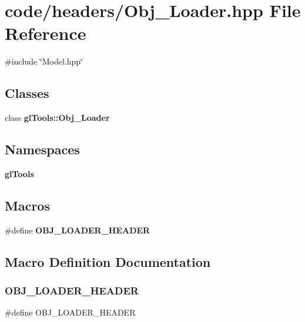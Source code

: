 \section{code/headers/\+Obj\+\_\+\+Loader.hpp File Reference}
\label{_obj___loader_8hpp}
{\ttfamily \#include \char`\"{}Model.\+hpp\char`\"{}}\newline
\subsection*{Classes}
\begin{DoxyCompactItemize}
\item 
class \textbf{ gl\+Tools\+::\+Obj\+\_\+\+Loader}
\end{DoxyCompactItemize}
\subsection*{Namespaces}
\begin{DoxyCompactItemize}
\item 
 \textbf{ gl\+Tools}
\end{DoxyCompactItemize}
\subsection*{Macros}
\begin{DoxyCompactItemize}
\item 
\#define \textbf{ O\+B\+J\+\_\+\+L\+O\+A\+D\+E\+R\+\_\+\+H\+E\+A\+D\+ER}
\end{DoxyCompactItemize}


\subsection{Macro Definition Documentation}
\mbox{\label{_obj___loader_8hpp_a4a0476ec138195e39102f9229b1f2ae0}} 
\subsubsection{OBJ\_LOADER\_HEADER}
{\footnotesize\ttfamily \#define O\+B\+J\+\_\+\+L\+O\+A\+D\+E\+R\+\_\+\+H\+E\+A\+D\+ER}

